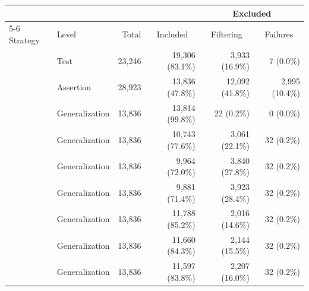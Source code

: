   \begin{tabular*}{\linewidth}{@{\hspace{\tabcolsep}\extracolsep{\fill}}llrrrr}
  \toprule
   &  &  &  & \multicolumn{2}{c}{Excluded} \\
  \cmidrule(lr){5-6}
  Strategy & Level & Total & \multicolumn{1}{c}{Included} & \multicolumn{1}{c}{Filtering} & \multicolumn{1}{c}{Failures} \\
  \midrule
  \VariantAll{} & Test & 23,246 & 19,306\; (83.1\%) & 3,933\; (16.9\%) & 7\; (\phantom{0}0.0\%) \\
  \midrule
  \VariantAll{} & Assertion & 28,923 & 13,836\; (47.8\%) & 12,092\; (41.8\%) & 2,995\; (10.4\%) \\
  \midrule
  \VariantBaseline{} & Generalization & 13,836 & 13,814\; (99.8\%) & 22\; (\phantom{0}0.2\%) & 0\; (\phantom{0}0.0\%) \\
  \VariantNaiveA{} & Generalization & 13,836 & 10,743\; (77.6\%) & 3,061\; (22.1\%) & 32\; (\phantom{0}0.2\%) \\
  \VariantNaiveB{} & Generalization & 13,836 & 9,964\; (72.0\%) & 3,840\; (27.8\%) & 32\; (\phantom{0}0.2\%) \\
  \VariantNaiveC{} & Generalization & 13,836 & 9,881\; (71.4\%) & 3,923\; (28.4\%) & 32\; (\phantom{0}0.2\%) \\
  \VariantImprovedA{} & Generalization & 13,836 & 11,788\; (85.2\%) & 2,016\; (14.6\%) & 32\; (\phantom{0}0.2\%) \\
  \VariantImprovedB{} & Generalization & 13,836 & 11,660\; (84.3\%) & 2,144\; (15.5\%) & 32\; (\phantom{0}0.2\%) \\
  \VariantImprovedC{} & Generalization & 13,836 & 11,597\; (83.8\%) & 2,207\; (16.0\%) & 32\; (\phantom{0}0.2\%) \\
  \bottomrule
  \end{tabular*}
